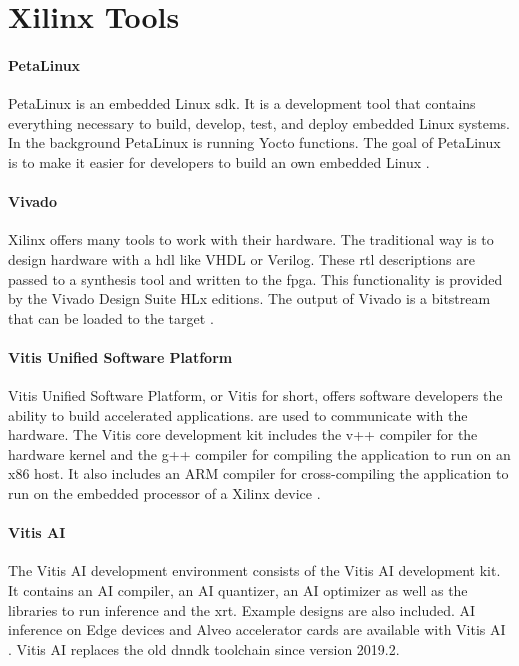 \section{Xilinx Tools}
\label{sec:embedded_platform:xilinx_tools}

\paragraph{PetaLinux}
PetaLinux is an embedded Linux \acrfull{sdk}.
It is a development tool that contains everything necessary to build, develop, test, and deploy embedded Linux systems.
In the background PetaLinux is running Yocto functions.
The goal of PetaLinux is to make it easier for developers to build an own embedded Linux \cite{petalinux_user_guide}.

\paragraph{Vivado}
Xilinx offers many tools to work with their hardware.
The traditional way is to design hardware with a \acrfull{hdl} like VHDL or Verilog.
These \acrfull{rtl} descriptions are passed to a synthesis tool and written to the \acrshort{fpga}.
This functionality is provided by the Vivado Design Suite HLx editions.
The output of Vivado is a bitstream that can be loaded to the target \cite{vivado_user_guide}.

\paragraph{Vitis Unified Software Platform}
Vitis Unified Software Platform, or Vitis for short, offers software developers the ability to build accelerated applications.
 are used to communicate with the hardware.
The Vitis core development kit includes the v++ compiler for the hardware kernel and the g++ compiler for compiling the application to run on an x86 host.
It also includes an ARM compiler for cross-compiling the application to run on the embedded processor of a Xilinx device \cite{vitis_user_guide}.

\paragraph{Vitis AI}
The Vitis AI development environment consists of the Vitis AI development kit.
It contains an AI compiler, an AI quantizer, an AI optimizer as well as the libraries to run inference and the \acrfull{xrt}.
Example designs are also included.
AI inference on Edge devices and Alveo accelerator cards are available with Vitis AI \cite{vitis_ai_user_guide}.
Vitis AI replaces the old \acrshort{dnndk} toolchain since version 2019.2.

